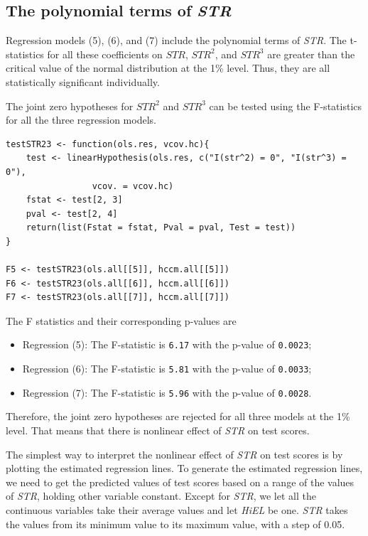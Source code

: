 \documentclass[11pt]{article}
\begin{document}
\subsection*{The polynomial terms of \emph{STR}}
\label{sec:org97e04e0}
Regression models (5), (6), and (7) include the polynomial terms of
\emph{STR}. The t-statistics for all these coefficients on \(STR\), \(STR^2\),
and \(STR^3\) are greater than the critical value of the normal
distribution at the 1\% level. Thus, they are all statistically
significant individually.

The joint zero hypotheses for \(STR^2\) and \(STR^3\) can be tested using
the F-statistics for all the three regression models.

\begin{verbatim}
testSTR23 <- function(ols.res, vcov.hc){
    test <- linearHypothesis(ols.res, c("I(str^2) = 0", "I(str^3) = 0"),
			     vcov. = vcov.hc)
    fstat <- test[2, 3]
    pval <- test[2, 4]
    return(list(Fstat = fstat, Pval = pval, Test = test))
}

F5 <- testSTR23(ols.all[[5]], hccm.all[[5]])
F6 <- testSTR23(ols.all[[6]], hccm.all[[6]])
F7 <- testSTR23(ols.all[[7]], hccm.all[[7]])
\end{verbatim}

The F statistics and their corresponding p-values are
\begin{itemize}
\item Regression (5): The F-statistic is \texttt{6.17} with
the p-value of \texttt{0.0023};
\item Regression (6): The F-statistic is \texttt{5.81} with
the p-value of \texttt{0.0033};
\item Regression (7): The F-statistic is \texttt{5.96} with
the p-value of \texttt{0.0028}.
\end{itemize}
Therefore, the joint zero hypotheses are rejected for all three models
at the 1\% level. That means that there is nonlinear effect of \emph{STR} on
test scores.

The simplest way to interpret the nonlinear effect of \emph{STR} on test
scores is by plotting the estimated regression lines. To generate the
estimated regression lines, we need to get the predicted values of test
scores based on a range of the values of \emph{STR}, holding other variable
constant. Except for \emph{STR}, we let all the continuous variables take
their average values and let \emph{HiEL} be one. \emph{STR} takes the values
from its minimum value to its maximum value, with a step of 0.05.
\end{document}
